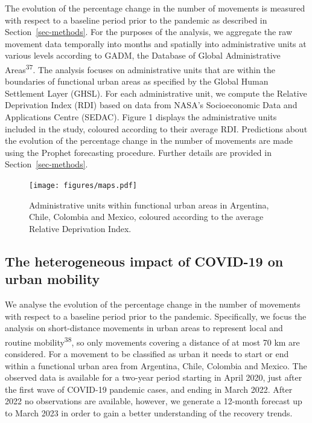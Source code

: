 \documentclass[
  11pt,
]{article}
\begin{document}
The evolution of the percentage change in the number of movements is
measured with respect to a baseline period prior to the pandemic as
described in Section~\ref{sec-methods}. For the purposes of the
analysis, we aggregate the raw movement data temporally into months and
spatially into administrative units at various levels according to GADM,
the Database of Global Administrative Areas\textsuperscript{37}. The
analysis focuses on administrative units that are within the boundaries
of functional urban areas as specified by the Global Human Settlement
Layer (GHSL). For each administrative unit, we compute the Relative
Deprivation Index (RDI) based on data from NASA's Socioeconomic Data and
Applications Centre (SEDAC). Figure 1 displays the administrative units
included in the study, coloured according to their average RDI.
Predictions about the evolution of the percentage change in the number
of movements are made using the Prophet forecasting procedure. Further
details are provided in Section~\ref{sec-methods}.

\begin{figure}[H]

{\centering \texttt{[image: figures/maps.pdf]}

}

\caption{Administrative units within functional urban areas in
Argentina, Chile, Colombia and Mexico, coloured according to the average
Relative Deprivation Index.}

\end{figure}%

\subsection{The heterogeneous impact of COVID-19 on urban
mobility}\label{the-heterogeneous-impact-of-covid-19-on-urban-mobility}

We analyse the evolution of the percentage change in the number of
movements with respect to a baseline period prior to the pandemic.
Specifically, we focus the analysis on short-distance movements in urban
areas to represent local and routine mobility\textsuperscript{38}, so
only movements covering a distance of at most 70 km are considered. For
a movement to be classified as urban it needs to start or end within a
functional urban area from Argentina, Chile, Colombia and Mexico. The
observed data is available for a two-year period starting in April 2020,
just after the first wave of COVID-19 pandemic cases, and ending in
March 2022. After 2022 no observations are available, however, we
generate a 12-month forecast up to March 2023 in order to gain a better
understanding of the recovery trends.
\end{document}

